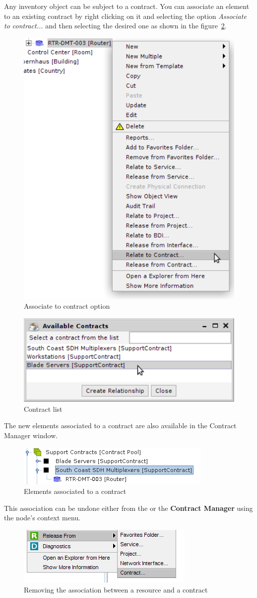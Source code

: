 \documentclass[a4paper]{article}
\begin{document}
		Any inventory object can be subject to a contract. You can associate an element to an existing contract by right clicking on it and selecting the option \textit{Associate to contract...} and then selecting the desired one as shown in the figure~\ref{fig:contract_manager_contract_list}.
		\begin{figure}[h!]
			\centering
			\includegraphics[width=0.4\linewidth]{img/contract_manager_associate_option.png}
			\caption{Associate to contract option}
			\label{fig:contract_manager_associate_option}
		\end{figure}		
		\newline
		\begin{figure}[h!]
			\centering
			\includegraphics[width=0.4\linewidth]{img/contract_manager_contract_list.png}
			\caption{Contract list}
			\label{fig:contract_manager_contract_list}
		\end{figure}
		
		The new elements associated to a contract are also available in the Contract Manager window.
		\begin{figure}[h!]
			\centering
			\includegraphics[width=0.4\linewidth]{img/contract_manager_elements.png}
			\caption{Elements associated to a contract}
			\label{fig:contract_manager_elements}
		\end{figure}
		
		\newpage
		This association can be undone either from the \textbf{} or the \textbf{Contract Manager} using the node's context menu.
		\begin{figure}[h!]
			\centering
			\includegraphics[width=0.6\linewidth]{img/contract_manager_release_from_contract.png}
			\caption{Removing the association between a resource and a contract}
			\label{fig:contract_manager_release_from_contract}
		\end{figure}
		
\end{document}
